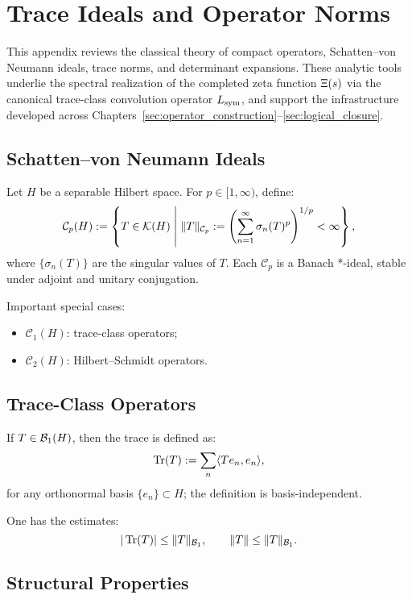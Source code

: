 \section{Trace Ideals and Operator Norms}
\label{app:trace_ideals_review}

This appendix reviews the classical theory of compact operators, Schatten–von Neumann ideals, trace norms, and determinant expansions. These analytic tools underlie the spectral realization of the completed zeta function \( \Xi(s) \) via the canonical trace-class convolution operator \( L_{\mathrm{sym}} \), and support the infrastructure developed across Chapters~\ref{sec:operator_construction}–\ref{sec:logical_closure}.

\subsection*{Schatten–von Neumann Ideals}

Let \( H \) be a separable Hilbert space. For \( p \in [1, \infty) \), define:
\[
\mathcal{C}_p(H) := \left\{ T \in \mathcal{K}(H) \;\middle|\; \|T\|_{\mathcal{C}_p} := \left( \sum_{n=1}^\infty \sigma_n(T)^p \right)^{1/p} < \infty \right\},
\]
where \( \{\sigma_n(T)\} \) are the singular values of \( T \). Each \( \mathcal{C}_p \) is a Banach *-ideal, stable under adjoint and unitary conjugation.

\smallskip
Important special cases:
\begin{itemize}
  \item \( \mathcal{C}_1(H) \): trace-class operators;
  \item \( \mathcal{C}_2(H) \): Hilbert–Schmidt operators.
\end{itemize}

\subsection*{Trace-Class Operators}

If \( T \in \mathcal{B}_1(H) \), then the trace is defined as:
\[
\operatorname{Tr}(T) := \sum_n \langle T e_n, e_n \rangle,
\]
for any orthonormal basis \( \{e_n\} \subset H \); the definition is basis-independent.

One has the estimates:
\[
|\operatorname{Tr}(T)| \le \|T\|_{\mathcal{B}_1}, \qquad \|T\| \le \|T\|_{\mathcal{B}_1}.
\]

\subsection*{Structural Properties}


